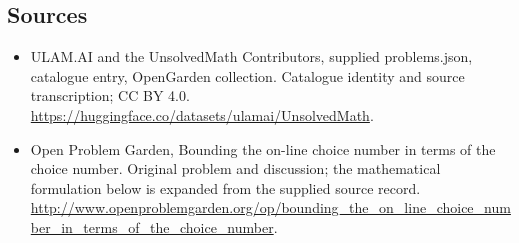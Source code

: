 \documentclass[11pt,a4paper]{article}
\begin{document}
\subsection{Sources}
\begin{itemize}
\item[S1] ULAM.AI and the UnsolvedMath Contributors, supplied problems.json, catalogue entry, OpenGarden collection. Catalogue identity and source transcription; CC BY 4.0.
\url{https://huggingface.co/datasets/ulamai/UnsolvedMath}.
\item[S2] Open Problem Garden, Bounding the on-line choice number in terms of the choice number. Original problem and discussion; the mathematical formulation below is expanded from the supplied source record.
\url{http://www.openproblemgarden.org/op/bounding_the_on_line_choice_number_in_terms_of_the_choice_number}.
\end{itemize}
\end{document}
